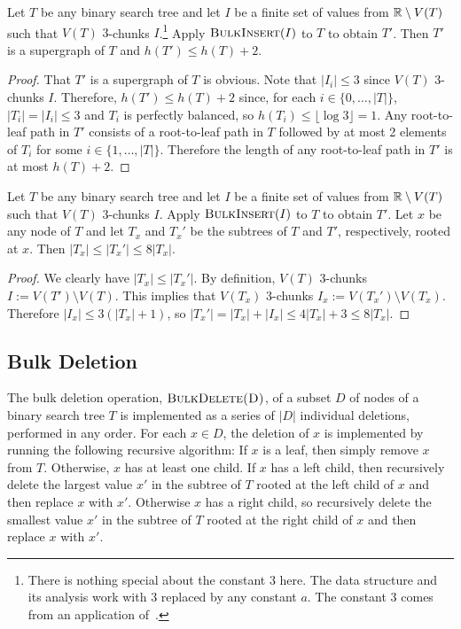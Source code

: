 \documentclass[kpfonts]{patmorin}
\let\le\leqslant
\begin{document}
\begin{lem}
  Let $T$ be any binary search tree and let $I$ be a finite set of values from $\mathbb{R}\setminus V(T)$ such that
  $V(T)$ $3$-chunks $I$.\footnote{There is nothing special about the constant $3$ here.  The data structure and its analysis work with $3$ replaced by any constant $a$. The constant $3$ comes from an application of~.}
  Apply $\textsc{BulkInsert}(I)$ to $T$ to obtain $T'$.
  Then $T'$ is a supergraph of $T$ and $h(T')\le h(T)+2$.
\end{lem}

\begin{proof}
  That $T'$ is a supergraph of $T$ is obvious.  Note that $|I_i|\le 3$ since $V(T)$ $3$-chunks $I$.  Therefore, $h(T')\le h(T)+2$ since, for each $i\in\{0,\dots,|T|\}$, $|T_i|=|I_i|\le 3$ and $T_i$ is perfectly balanced, so $h(T_i)\le\lfloor\log 3\rfloor = 1$.  Any root-to-leaf path in $T'$ consists of a root-to-leaf path in $T$ followed by at most 2 elements of $T_i$ for some $i\in\{1,\dots,|T|\}$.  Therefore the length of any root-to-leaf path in $T'$ is at most $h(T)+2$.
\end{proof}

\begin{lem}
  Let $T$ be any binary search tree and let $I$ be a finite set of values from $\mathbb{R}\setminus V(T)$ such that
  $V(T)$ $3$-chunks $I$.
  Apply $\textsc{BulkInsert}(I)$ to $T$ to obtain $T'$.
  Let $x$ be any node of $T$ and let $T_x$ and $T_x'$ be the subtrees of $T$ and $T'$, respectively, rooted at $x$.
  Then $|T_x|\le |T_x'|\le 8|T_x|$.
\end{lem}

\begin{proof}
We clearly have  $|T_x|\le |T_x'|$.  By definition, $V(T)$ 3-chunks $I:=V(T')\setminus V(T)$.  This implies that $V(T_x)$ 3-chunks $I_x:=V(T_x')\setminus V(T_x)$.  Therefore $|I_x|\le 3(|T_x|+1)$, so $|T_x'|=|T_x|+|I_x|\le 4|T_x|+3 \le 8|T_x|$.
\end{proof}


\subsection{Bulk Deletion}

The bulk deletion operation, $\textsc{BulkDelete(D)}$, of a subset $D$ of nodes of a binary search tree $T$ is implemented as a series of $|D|$ individual deletions, performed in any order. For each $x\in D$, the deletion of $x$ is implemented by running the following recursive algorithm:  If $x$ is a leaf, then simply remove $x$ from $T$.  Otherwise, $x$ has at least one child.  If $x$ has a left child, then recursively delete the largest value $x'$ in the subtree of $T$ rooted at the left child of $x$ and then replace $x$ with $x'$.  Otherwise $x$ has a right child, so recursively delete the smallest value $x'$ in the subtree of $T$ rooted at the right child of $x$ and then replace $x$ with $x'$.
\end{document}
